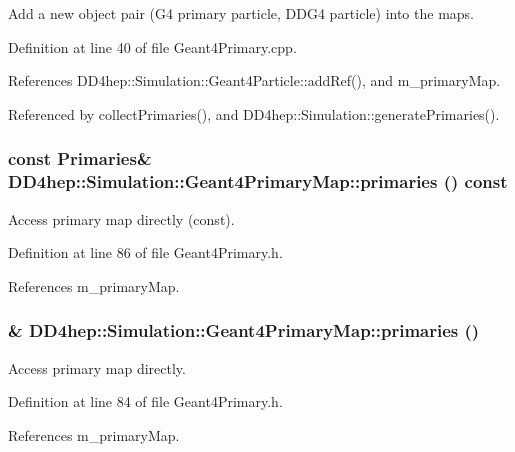 Add a new object pair (G4 primary particle, DDG4 particle) into the maps. 

Definition at line 40 of file Geant4Primary.cpp.

References DD4hep::Simulation::Geant4Particle::addRef(), and m\_\-primaryMap.

Referenced by collectPrimaries(), and DD4hep::Simulation::generatePrimaries().\hypertarget{class_d_d4hep_1_1_simulation_1_1_geant4_primary_map_a1eb1af14b00a614c5402bdf6c050fef7}{
\subsubsection[{primaries}]{\setlength{\rightskip}{0pt plus 5cm}const {\bf Primaries}\& DD4hep::Simulation::Geant4PrimaryMap::primaries () const}}
\label{class_d_d4hep_1_1_simulation_1_1_geant4_primary_map_a1eb1af14b00a614c5402bdf6c050fef7}


Access primary map directly (const). 

Definition at line 86 of file Geant4Primary.h.

References m\_\-primaryMap.\hypertarget{class_d_d4hep_1_1_simulation_1_1_geant4_primary_map_a3c59e375ae3f9c00b5924a627cf73241}{
\subsubsection[{primaries}]{\& DD4hep::Simulation::Geant4PrimaryMap::primaries ()}}
\label{class_d_d4hep_1_1_simulation_1_1_geant4_primary_map_a3c59e375ae3f9c00b5924a627cf73241}


Access primary map directly. 

Definition at line 84 of file Geant4Primary.h.

References m\_\-primaryMap.

